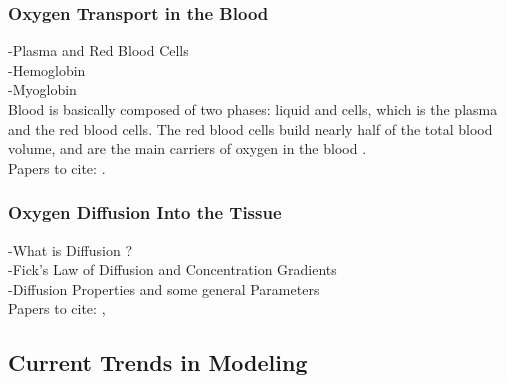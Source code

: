 \subsubsection*{Oxygen Transport in the Blood}

-Plasma and Red Blood Cells
\\-Hemoglobin
\\-Myoglobin
\\Blood is basically composed of two phases: liquid and cells, which is the plasma and the red blood cells. The red blood cells build nearly half of the total blood volume, and are the main carriers of oxygen in the blood \cite{pittman2011regulation}.
\\Papers to cite: \cite{hellums1977resistance}.

\subsubsection*{Oxygen Diffusion Into the Tissue}

-What is Diffusion ?
\\-Fick's Law of Diffusion and Concentration Gradients
\\-Diffusion Properties and some general Parameters
\\Papers to cite: \cite{hellums1977resistance}, \cite{fletcher1980facilitated}
\\

\subsection{Current Trends in Modeling}

